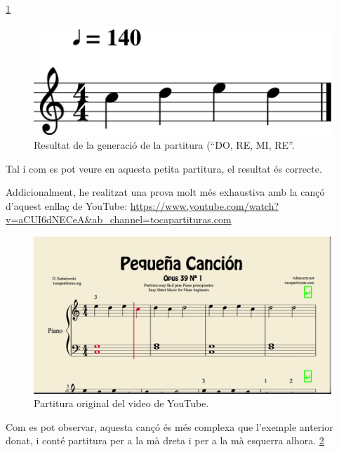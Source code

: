 \documentclass[10pt,a4paper,twocolumn,twoside]{article}
\begin{document}
\ref{fig:generacio-partitura-exemple-doremire}
\begin{figure}[h]
    \centering
    \includegraphics[width=1\linewidth]{img/generacioPartituraDoReMiRe.png}
    \caption{Resultat de la generació de la partitura (``DO, RE, MI, RE''.}
    \label{fig:generacio-partitura-exemple-doremire}
\end{figure}

Tal i com es pot veure en aquesta petita partitura, el resultat és correcte.

Addicionalment, he realitzat una prova molt més exhaustiva amb la cançó d'aquest enllaç de YouTube: \url{https://www.youtube.com/watch?v=aCUI6dNECeA&ab_channel=tocapartituras.com}
\begin{figure}[h]
    \centering
    \includegraphics[width=1\linewidth]{img/screenshot-partitura-correcta.png}
    \caption{Partitura original del video de YouTube.}
    \label{fig:paritura-original}
\end{figure}
Com es pot observar, aquesta cançó és més complexa que l'exemple anterior donat, i conté partitura per a la mà dreta i per a la mà esquerra alhora. \ref{fig:paritura-original}
\end{document}
